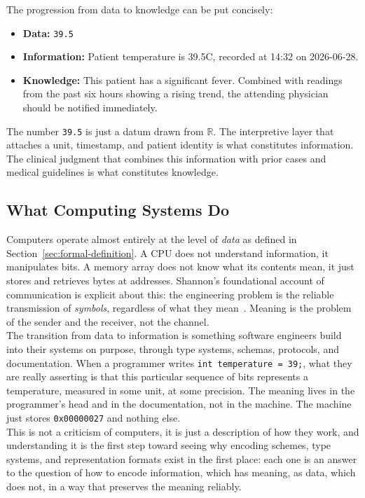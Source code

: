 \begin{example}
\label{ex:fever}
The progression from data to knowledge can be put concisely:
\begin{itemize}
  \item \textbf{Data:} \texttt{39.5}
  \item \textbf{Information:} Patient temperature is 39.5\textdegree C, recorded
        at 14:32 on 2026-06-28.
  \item \textbf{Knowledge:} This patient has a significant fever. Combined with
        readings from the past six hours showing a rising trend, the attending
        physician should be notified immediately.
\end{itemize}
The number \texttt{39.5} is just a datum drawn from $\mathbb{R}$. The
interpretive layer that attaches a unit, timestamp, and patient identity is
what constitutes information. The clinical judgment that combines this
information with prior cases and medical guidelines is what constitutes
knowledge.
\end{example}

\subsection{What Computing Systems Do}

Computers operate almost entirely at the level of \emph{data} as defined in
Section~\ref{sec:formal-definition}. A CPU does not understand information,
it manipulates bits. A memory array does not know what its contents mean, it
just stores and retrieves bytes at addresses. Shannon's foundational account
of communication is explicit about this: the engineering problem is the
reliable transmission of \emph{symbols}, regardless of what they
mean~\autocite{shannon1948}. Meaning is the problem of the sender and the
receiver, not the channel.\\
The transition from data to information is something software engineers build
into their systems on purpose, through type systems, schemas, protocols, and
documentation. When a programmer writes \texttt{int temperature = 39;}, what
they are really asserting is that this particular sequence of bits represents
a temperature, measured in some unit, at some precision. The meaning lives in
the programmer's head and in the documentation, not in the machine. The
machine just stores \texttt{0x00000027} and nothing else.\\
This is not a criticism of computers, it is just a description of how they
work, and understanding it is the first step toward seeing why encoding
schemes, type systems, and representation formats exist in the first place:
each one is an answer to the question of how to encode information, which has
meaning, as data, which does not, in a way that preserves the meaning
reliably.

